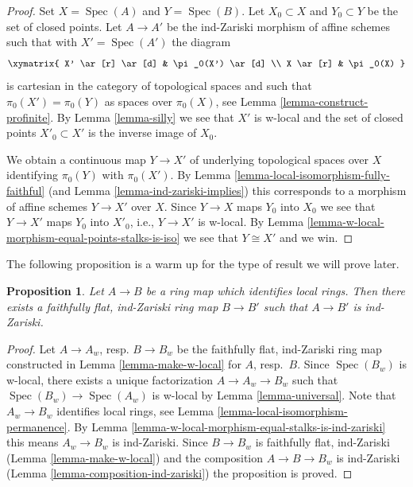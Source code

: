 \documentclass[10pt,a4paper]{article}
\theoremstyle{plain}
\newtheorem{proposition}[subsection]{Proposition}
\theoremstyle{definition}
\theoremstyle{remark}
\numberwithin{equation}{subsection}
\def\Spec{\mathop{\mathrm{Spec}}}
\begin{document}
\begin{proof}
Set $X = \Spec(A)$ and $Y = \Spec(B)$. Let $X_0 \subset X$ and
$Y_0 \subset Y$ be the set of closed points. Let $A \to A'$ be the ind-Zariski
morphism of affine schemes such that with $X' = \Spec(A')$ the diagram
$$
\xymatrix{
X' \ar[r] \ar[d] & \pi_0(X') \ar[d] \\
X \ar[r] & \pi_0(X)
}
$$
is cartesian in the category of topological spaces and such that
$\pi_0(X') = \pi_0(Y)$ as spaces over $\pi_0(X)$, see
Lemma \ref{lemma-construct-profinite}. By
Lemma \ref{lemma-silly} we see that $X'$ is w-local and
the set of closed points $X'_0 \subset X'$ is the inverse image of $X_0$.

\medskip\noindent
We obtain a continuous map $Y \to X'$ of underlying topological spaces
over $X$ identifying $\pi_0(Y)$ with $\pi_0(X')$. By
Lemma \ref{lemma-local-isomorphism-fully-faithful}
(and Lemma \ref{lemma-ind-zariski-implies})
this corresponds to a morphism of affine schemes $Y \to X'$
over $X$. Since $Y \to X$ maps $Y_0$ into $X_0$ we see that
$Y \to X'$ maps $Y_0$ into $X'_0$, i.e., $Y \to X'$ is w-local.
By Lemma \ref{lemma-w-local-morphism-equal-points-stalks-is-iso}
we see that $Y \cong X'$ and we win.
\end{proof}

\noindent
The following proposition is a warm up for the type of result
we will prove later.

\begin{proposition}
\label{proposition-maps-wich-identify-local-rings}
Let $A \to B$ be a ring map which identifies local rings.
Then there exists a faithfully flat, ind-Zariski ring map
$B \to B'$ such that $A \to B'$ is ind-Zariski.
\end{proposition}

\begin{proof}
Let $A \to A_w$, resp. $B \to B_w$ be the faithfully flat, ind-Zariski ring
map constructed in Lemma \ref{lemma-make-w-local} for $A$, resp.\ $B$.
Since $\Spec(B_w)$ is w-local, there exists a unique factorization
$A \to A_w \to B_w$ such that $\Spec(B_w) \to \Spec(A_w)$ is w-local
by Lemma \ref{lemma-universal}. Note that $A_w \to B_w$ identifies
local rings, see
Lemma \ref{lemma-local-isomorphism-permanence}.
By Lemma \ref{lemma-w-local-morphism-equal-stalks-is-ind-zariski}
this means $A_w \to B_w$ is ind-Zariski. Since $B \to B_w$ is
faithfully flat, ind-Zariski (Lemma \ref{lemma-make-w-local})
and the composition $A \to B \to B_w$ is ind-Zariski
(Lemma \ref{lemma-composition-ind-zariski})
the proposition is proved.
\end{proof}
\end{document}
